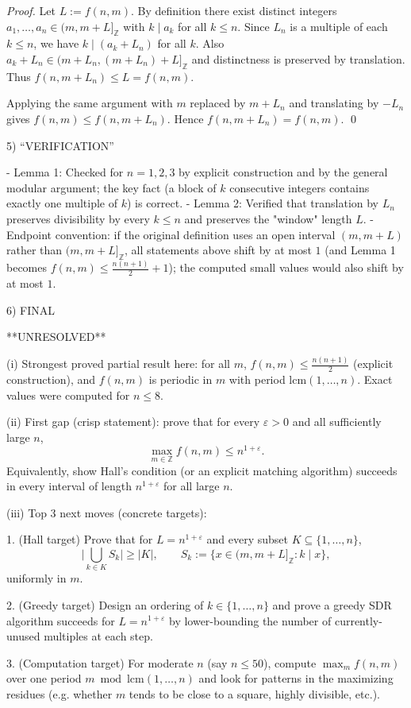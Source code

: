 \emph{Proof.}
Let $L:=f(n,m)$. By definition there exist distinct integers $a_1,\dots,a_n\in(m,m+L]_{\mathbb Z}$ with $k\mid a_k$ for all $k\le n$.
Since $L_n$ is a multiple of each $k\le n$, we have $k\mid (a_k+L_n)$ for all $k$.
Also $a_k+L_n\in(m+L_n,(m+L_n)+L]_{\mathbb Z}$ and distinctness is preserved by translation.
Thus $f(n,m+L_n)\le L=f(n,m)$.

Applying the same argument with $m$ replaced by $m+L_n$ and translating by $-L_n$ gives $f(n,m)\le f(n,m+L_n)$.
Hence $f(n,m+L_n)=f(n,m)$.
\qed

5) “VERIFICATION”

- Lemma 1: Checked for $n=1,2,3$ by explicit construction and by the general modular argument; the key fact (a block of $k$ consecutive integers contains exactly one multiple of $k$) is correct.
- Lemma 2: Verified that translation by $L_n$ preserves divisibility by every $k\le n$ and preserves the "window" length $L$.
- Endpoint convention: if the original definition uses an open interval $(m,m+L)$ rather than $(m,m+L]_{\mathbb Z}$, all statements above shift by at most $1$ (and Lemma 1 becomes $f(n,m)\le \frac{n(n+1)}2+1$); the computed small values would also shift by at most $1$.

6) FINAL

**UNRESOLVED**

(i) Strongest proved partial result here: for all $m$, $f(n,m)\le \frac{n(n+1)}2$ (explicit construction), and $f(n,m)$ is periodic in $m$ with period $\mathrm{lcm}(1,\dots,n)$. Exact values were computed for $n\le 8$.

(ii) First gap (crisp statement): prove that for every $\varepsilon>0$ and all sufficiently large $n$,
\[
\max_{m\in\mathbb Z} f(n,m) \le n^{1+\varepsilon}.
\]
Equivalently, show Hall's condition (or an explicit matching algorithm) succeeds in every interval of length $n^{1+\varepsilon}$ for all large $n$.

(iii) Top 3 next moves (concrete targets):

1. (Hall target) Prove that for $L=n^{1+\varepsilon}$ and every subset $K\subseteq\{1,\dots,n\}$,
\[\bigl|\bigcup_{k\in K} S_k\bigr|\ge |K|,\qquad S_k:=\{x\in(m,m+L]_{\mathbb Z}:k\mid x\},\]
uniformly in $m$.

2. (Greedy target) Design an ordering of $k\in\{1,\dots,n\}$ and prove a greedy SDR algorithm succeeds for $L=n^{1+\varepsilon}$ by lower-bounding the number of currently-unused multiples at each step.

3. (Computation target) For moderate $n$ (say $n\le 50$), compute $\max_m f(n,m)$ over one period $m\bmod\mathrm{lcm}(1,\dots,n)$ and look for patterns in the maximizing residues (e.g. whether $m$ tends to be close to a square, highly divisible, etc.).

